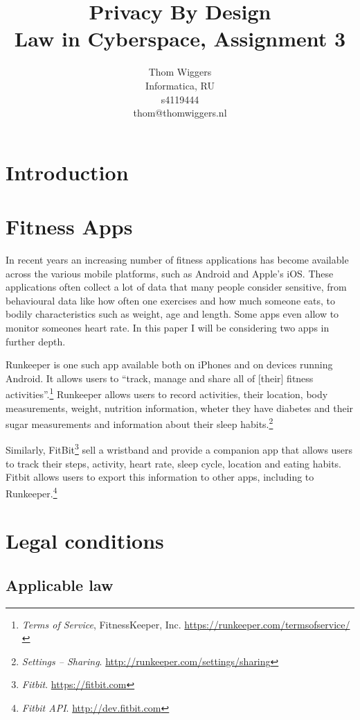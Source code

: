 \documentclass{article}
\author{Thom Wiggers\\ \small Informatica, RU \\ \small s4119444 \\ \small thom@thomwiggers.nl }
\title{Privacy By Design\\ {\large Law in Cyberspace, Assignment 3}}
\begin{document}
\maketitle

\section{Introduction}

\section{Fitness Apps}

In recent years an increasing number of fitness applications has become available across the various mobile platforms, such as Android and Apple's iOS.
These applications often collect a lot of data that many people consider sensitive, from behavioural data like how often one exercises and how much someone eats, to bodily characteristics such as weight, age and length.
Some apps even allow to monitor someones heart rate. In this paper I will be considering two apps in further depth.

Runkeeper is one such app available both on iPhones and on devices running Android. It allows users to ``track, manage and share all of [their] fitness activities''.\footnote{\emph{Terms of Service}, FitnessKeeper, Inc. \url{https://runkeeper.com/termsofservice/}}
Runkeeper allows users to record activities, their location, body measurements, weight, nutrition information, wheter they have diabetes and their sugar measurements and information about their sleep habits.\footnote{\emph{Settings -- Sharing}. \url{http://runkeeper.com/settings/sharing}}

Similarly, FitBit\footnote{\emph{Fitbit}. \url{https://fitbit.com}} sell a wristband and provide a companion app that allows users to track their steps, activity, heart rate, sleep cycle, location and eating habits.
Fitbit allows users to export this information to other apps, including to Runkeeper.\footnote{\emph{Fitbit API}. \url{http://dev.fitbit.com}}

\section{Legal conditions}

\subsection{Applicable law}
\end{document}

